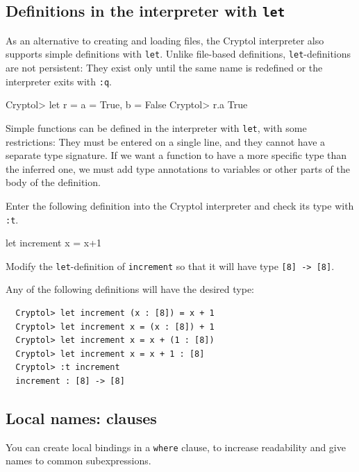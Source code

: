 \subsection{Definitions in the interpreter with \texttt{let}}
\label{sec:interpreter-let}
As an alternative to creating and loading files, the Cryptol
interpreter also supports simple definitions with \texttt{let}. Unlike
file-based definitions, \texttt{let}-definitions are not persistent:
They exist only until the same name is redefined or the interpreter
exits with \texttt{:q}.
\begin{code}
  Cryptol> let r = {a = True, b = False}
  Cryptol> r.a
  True
\end{code}
Simple functions can be defined in the interpreter with \texttt{let},
with some restrictions: They must be entered on a single line, and
they cannot have a separate type signature. If we want a function to
have a more specific type than the inferred one, we must add type
annotations to variables or other parts of the body of the definition.
\begin{Exercise}\label{ex:fn:0b}
  Enter the following definition into the Cryptol interpreter and check
  its type with \texttt{:t}.
\begin{code}
  let increment x = x+1
\end{code}
Modify the \texttt{let}-definition of \texttt{increment} so that it
will have type \texttt{[8] -> [8]}.
\end{Exercise}
\begin{Answer}
Any of the following definitions will have the desired type:
\begin{Verbatim}
  Cryptol> let increment (x : [8]) = x + 1
  Cryptol> let increment x = (x : [8]) + 1
  Cryptol> let increment x = x + (1 : [8])
  Cryptol> let increment x = x + 1 : [8]
  Cryptol> :t increment
  increment : [8] -> [8]
\end{Verbatim}
\end{Answer}

\subsection{Local names: {} clauses}
\label{sec:local-names:-ttfam}

You can create local bindings in a {\tt where} clause\indWhere, to
increase readability and give names to common subexpressions.

